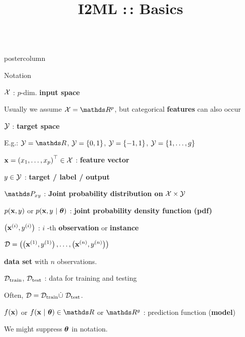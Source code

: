 \documentclass{beamer}
\title{I2ML :\,: Basics} %
\newlength{\columnheight} %
\begin{document}
\begin{frame}[fragile]{}
\vspace{-8ex}
\begin{columns}
	\begin{column}{.31\textwidth}
		\begin{beamercolorbox}[center]{postercolumn}
			\begin{minipage}{.98\textwidth}
				\parbox[t][\columnheight]{\textwidth}{				
					\begin{myblock}{Notation}
						\begin{codebox}
						    $\mathcal{X}$ : $p$-dim. 
						    \textbf{input space} %
						\end{codebox}
						\hspace*{1ex}Usually we assume $\Xspace = \R^p$, but categorical \textbf{features} can also occur 
						
							$\mathcal{Y}$ : \textbf{target space} \bigskip
						
						\hspace*{1ex}E.g.: $\Yspace = \R$, $\mathcal{Y} = \lbrace 0, 1 \rbrace$, $\mathcal{Y} = \lbrace -1, 1 \rbrace$, $\mathcal{Y} = \{1, \ldots, g\}$				
						
							$\mathbf{x} = \left(x_1, \ldots, x_p\right)^\top \in \mathcal{X}$ : \textbf{feature vector}
						
						
							$y \in \mathcal{Y}$ : \textbf{target / label / output}
						
						
							 $\P_{xy}$ : \textbf{Joint probability distribution on} $\mathcal{X} \times \mathcal{Y}$
						
						
							$p(\mathbf{x},y)$ or $p(\mathbf{x}, y ~|~ \bm{\theta})$ : \textbf{joint probability density function (pdf)}
						

						
							$\left(\mathbf{x}^{(i)}, y^{(i)}\right)$ : $i$ -th \textbf{observation} or \textbf{instance}
						
					
						
						$\mathcal{D} = \left( \left(\mathbf{x}^{(1)}, y^{(1)}\right), \ldots, \left(\mathbf{x}^{(n)}, y^{(n)}\right)\right)$
						
						\hspace*{1ex}\textbf{data set} with $n$ observations.
						
												
							$\mathcal{D}_{\text{train}}$, $\mathcal{D}_{\text{test}}$ : data for training and testing
						
						\hspace*{1ex}Often, $\mathcal{D} = \mathcal{D}_{\text{train}} \dot{\cup} ~ \mathcal{D}_{\text{test}}$.
						
						
							$f(\mathbf{x})$ or $\fxt \in \R$ or $\R^g$ : prediction function (\textbf{model}) %
						
%						
%						
						\hspace*{1ex}We might suppress $\bm{\theta}$ in notation.
						

\end{myblock}}
\end{minipage}
\end{beamercolorbox}
\end{column}
\end{columns}
\end{frame}
\end{document}
